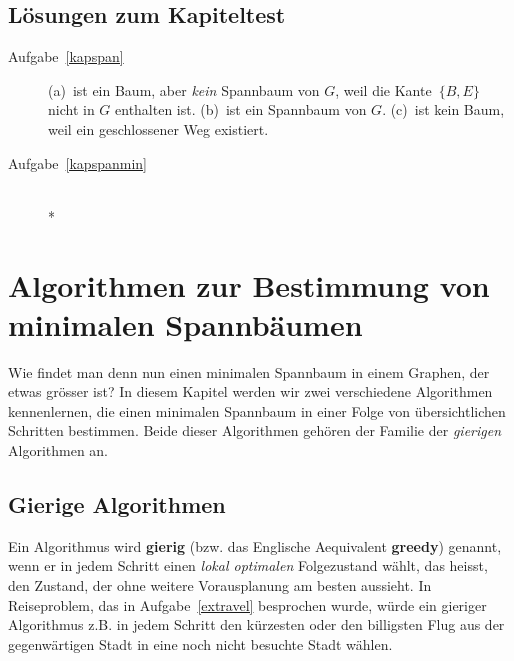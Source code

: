 \documentclass[12pt,a4paper]{report}
\theoremstyle{break}
\theoremstyle{plain}
\begin{document}
\section{L\"{o}sungen zum Kapiteltest}
\begin{description}
\item[Aufgabe~\ref{kapspan}] (a)~ist ein Baum, aber \emph{kein}
  Spannbaum von $G$, weil die Kante~$\{B,E\}$ nicht in $G$ enthalten
  ist. (b)~ist ein Spannbaum von $G$. (c)~ist kein
  Baum, weil ein geschlossener Weg existiert.
\item[Aufgabe~\ref{kapspanmin}] \hfill\\*

\begin{figure}[h!]
\setcounter{subfigure}{0}
\begin{subfigure}[b]{0.5\textwidth}
\caption{}
\end{subfigure}
\begin{subfigure}[b]{0.5\textwidth}
\caption{}
\end{subfigure}
\end{figure}
\end{description}

\chapter{Algorithmen zur Bestimmung von minimalen Spannb\"{a}umen}

Wie findet man denn nun einen minimalen Spannbaum in einem
Graphen, der etwas gr\"{o}sser ist? In diesem Kapitel werden wir zwei
verschiedene Algorithmen kennenlernen, die einen minimalen Spannbaum
in einer Folge von \"{u}bersichtlichen Schritten bestimmen. Beide
dieser Algorithmen geh\"{o}ren der Familie der \emph{gierigen}
Algorithmen an.

\section{Gierige Algorithmen}

Ein Algorithmus wird \textbf{gierig} (bzw. das Englische Aequivalent
\textbf{greedy}) genannt, wenn er in jedem Schritt einen \emph{lokal
  optimalen} Folgezustand w\"{a}hlt, das heisst, den Zustand, der ohne
weitere Vorausplanung am besten aussieht. In Reiseproblem, das in
Aufgabe~\ref{extravel} besprochen wurde, w\"{u}rde ein gieriger
Algorithmus z.B. in jedem Schritt den k\"{u}rzesten oder den
billigsten Flug aus der gegenw\"{a}rtigen Stadt in eine noch nicht
besuchte Stadt w\"{a}hlen.
\end{document}
